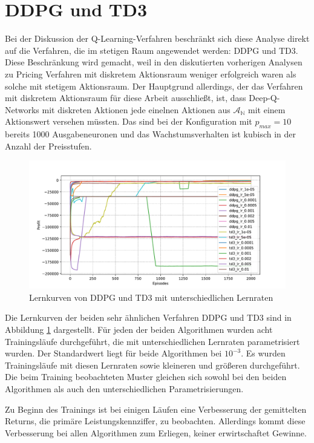 \section{DDPG und TD3}
\label{section:main_ddpg}
Bei der Diskussion der Q-Learning-Verfahren beschränkt sich diese Analyse direkt auf die Verfahren, die im stetigen Raum angewendet werden: DDPG und TD3.
Diese Beschränkung wird gemacht, weil in den diskutierten vorherigen Analysen zu Pricing Verfahren mit diskretem Aktionsraum weniger erfolgreich waren als solche mit stetigem Aktionsraum.
Der Hauptgrund allerdings, der das Verfahren mit diskretem Aktionsraum für diese Arbeit ausschließt, ist, dass Deep-Q-Networks mit diskreten Aktionen jede einelnen Aktionen aus $\mathcal{A_\mathbb{N}}$ mit einem Aktionswert versehen müssten.
Das sind bei der Konfiguration mit $p_{max}=10$ bereits 1000 Ausgabeneuronen und das Wachstumsverhalten ist kubisch in der Anzahl der Preisstufen.

\begin{figure}[htbp]
	\centering
	\includegraphics[width=\textwidth]{main/ddpg_td3.pdf}
	\caption{Lernkurven von DDPG und TD3 mit unterschiedlichen Lernraten}
	\label{graphic:DDPGLearningCurve}
\end{figure}

Die Lernkurven der beiden sehr ähnlichen Verfahren DDPG und TD3 sind in Abbildung \ref{graphic:DDPGLearningCurve} dargestellt.
Für jeden der beiden Algorithmen wurden acht Trainingsläufe durchgeführt, die mit unterschiedlichen Lernraten parametrisiert wurden.
Der Standardwert liegt für beide Algorithmen bei $10^{-3}$.
Es wurden Trainingsläufe mit diesen Lernraten sowie kleineren und größeren durchgeführt.
Die beim Training beobachteten Muster gleichen sich sowohl bei den beiden Algorithmen als auch den unterschiedlichen Parametrisierungen.

Zu Beginn des Trainings ist bei einigen Läufen eine Verbesserung der gemittelten Returns, die primäre Leistungskennziffer, zu beobachten.
Allerdings kommt diese Verbesserung bei allen Algorithmen zum Erliegen, keiner erwirtschaftet Gewinne.

